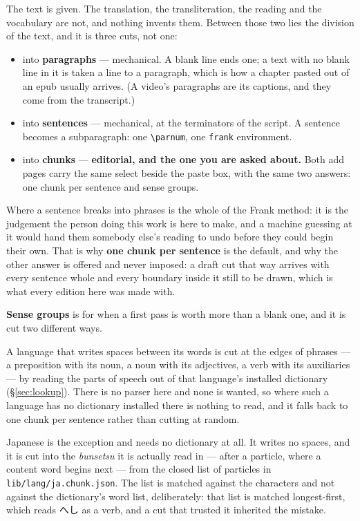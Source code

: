 \documentclass[11pt,oneside]{report}
\newcommand{\jw}[1]{\mbox{\foreignlanguage{japanese}{#1}}}
\newcommand{\file}[1]{\texttt{#1}}
\newcommand{\menu}[1]{\textsf{#1}}
\begin{document}
The text is given. The translation, the transliteration, the reading and the
vocabulary are not, and nothing invents them. Between those two lies the
division of the text, and it is three cuts, not one:

\begin{itemize}
\item into \textbf{paragraphs} --- mechanical. A blank line ends one; a text
  with no blank line in it is taken a line to a paragraph, which is how a
  chapter pasted out of an epub usually arrives. (A video's paragraphs are its
  captions, and they come from the transcript.)
\item into \textbf{sentences} --- mechanical, at the terminators of the
  script. A sentence becomes a subparagraph: one \verb|\parnum|, one
  \texttt{frank} environment.
\item into \textbf{chunks} --- \textbf{editorial, and the one you are asked
  about.} Both add pages carry the same select beside the paste box, with the
  same two answers: \menu{one chunk per sentence} and \menu{sense groups}.
\end{itemize}

\noindent Where a sentence breaks into phrases is the whole of the Frank
method: it is the judgement the person doing this work is here to make, and a
machine guessing at it would hand them somebody else's reading to undo before
they could begin their own. That is why \textbf{one chunk per sentence} is
the default, and why the other answer is offered and never imposed: a draft
cut that way arrives with every sentence whole and every boundary inside it
still to be drawn, which is what every edition here was made with.

\textbf{Sense groups} is for when a first pass is worth more than a blank
one, and it is cut two different ways.

A language that writes spaces between its words is cut at the edges of
phrases --- a preposition with its noun, a noun with its adjectives, a verb
with its auxiliaries --- by reading the parts of speech out of that
language's installed dictionary (\S\ref{sec:lookup}). There is no parser
here and none is wanted, so where such a language has no dictionary
installed there is nothing to read, and it falls back to one chunk per
sentence rather than cutting at random.

Japanese is the exception and needs no dictionary at all. It writes no
spaces, and it is cut into the \emph{bunsetsu} it is actually read in ---
after a particle, where a content word begins next --- from the closed list
of particles in \file{lib/lang/ja.chunk.json}. The list is matched against
the characters and not against the dictionary's word list, deliberately:
that list is matched longest-first, which reads \jw{へし} as a verb, and a
cut that trusted it inherited the mistake.
\end{document}
